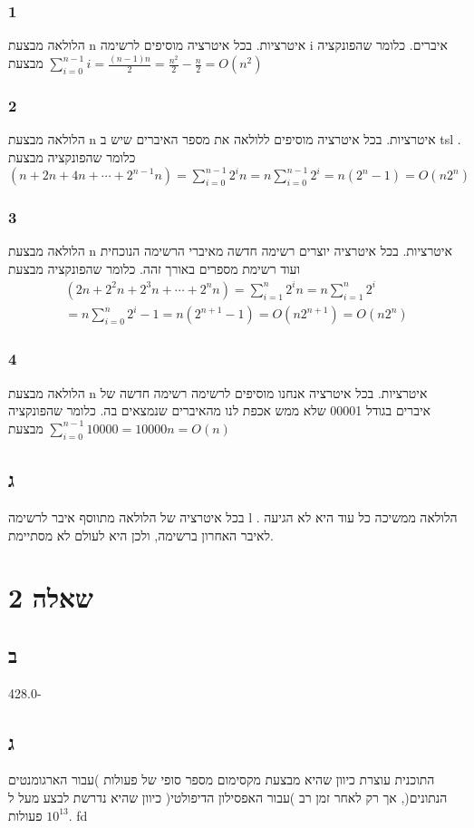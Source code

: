 \documentclass[a4paper]{article}
\begin{document}
\subsubsection*{1}
הלולאה מבצעת
n
איטרציות. בכל איטרציה מוסיפים לרשימה 
i
איברים. כלומר שהפונקציה מבצעת
$\sum\limits_{i=0}^{n-1} i = \frac{(n-1)n}{2} = \frac{n^2}{2} - \frac{n}{2} = O(n^2)$
\subsubsection*{2}
הלולאה מבצעת
n
איטרציות. בכל איטרציה מוסיפים ללולאה את מספר האיברים שיש ב
tsl
. כלומר שהפונקציה מבצעת
$(n + 2n + 4n + \cdots + 2^{n-1}n) = \sum\limits_{i=0}^{n-1} 2^i n 
= n \sum\limits_{i=0}^{n-1} 2^i
= n (2^n - 1) = O(n 2^n)$
\subsubsection*{3}
הלולאה מבצעת
n
איטרציות. בכל איטרציה יוצרים רשימה חדשה מאיברי הרשימה הנוכחית ועוד רשימת מספרים באורך זהה. כלומר שהפונקציה מבצעת
\begin{equation*}
    \begin{split}
        (2n + 2^2n + 2^3n + \cdots + 2^n n) = \sum\limits_{i=1}^n 2^i n
        = n \sum\limits_{i=1}^n 2^i \\
        = n \sum\limits_{i=0}^n 2^i - 1
        = n (2^{n+1} - 1) = O(n 2^{n+1}) = O(n 2^{n})
    \end{split}
\end{equation*}
\subsubsection*{4}
הלולאה מבצעת
n
איטרציות. בכל איטרציה אנחנו מוסיפים לרשימה רשימה חדשה של איברים בגודל
00001
שלא ממש אכפת לנו מהאיברים שנמצאים בה. כלומר שהפונקציה מבצעת
$ \sum\limits_{i=0}^{n-1} 10000 = 10000n = O(n)$
\subsection*{ג}
בכל איטרציה של הלולאה מתווסף איבר לרשימה
l
. הלולאה ממשיכה כל עוד היא לא הגיעה לאיבר האחרון ברשימה, ולכן היא לעולם לא מסתיימת.
\section*{שאלה 2}
\subsection*{ב}
428.0-
\subsection*{ג}
התוכנית עוצרת כיוון שהיא מבצעת מקסימום מספר סופי של פעולות )עבור הארגומנטים הנתונים(, אך רק לאחר זמן רב )עבור האפסילון הדיפולטי( כיוון שהיא נדרשת לבצע מעל ל
$10^{13}$
פעולות.
fd
\end{document}
